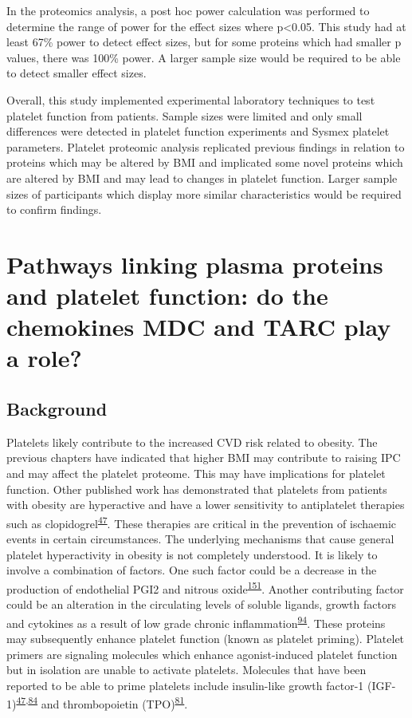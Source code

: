 \documentclass[11pt,twoside]{bristolthesis}
\begin{document}
In the proteomics analysis, a post hoc power calculation was performed to determine the range of power for the effect sizes where p\textless0.05. This study had at least 67\% power to detect effect sizes, but for some proteins which had smaller p values, there was 100\% power. A larger sample size would be required to be able to detect smaller effect sizes.

Overall, this study implemented experimental laboratory techniques to test platelet function from patients. Sample sizes were limited and only small differences were detected in platelet function experiments and Sysmex platelet parameters. Platelet proteomic analysis replicated previous findings in relation to proteins which may be altered by BMI and implicated some novel proteins which are altered by BMI and may lead to changes in platelet function. Larger sample sizes of participants which display more similar characteristics would be required to confirm findings.

\hypertarget{chemokine-platelets}{%
\chapter{Pathways linking plasma proteins and platelet function: do the chemokines MDC and TARC play a role?}\label{chemokine-platelets}}

\hypertarget{background-3}{%
\section{Background}\label{background-3}}

Platelets likely contribute to the increased CVD risk related to obesity. The previous chapters have indicated that higher BMI may contribute to raising IPC and may affect the platelet proteome. This may have implications for platelet function. Other published work has demonstrated that platelets from patients with obesity are hyperactive and have a lower sensitivity to antiplatelet therapies such as clopidogrel\textsuperscript{\protect\hyperlink{ref-Nardin2015}{47}}. These therapies are critical in the prevention of ischaemic events in certain circumstances. The underlying mechanisms that cause general platelet hyperactivity in obesity is not completely understood. It is likely to involve a combination of factors. One such factor could be a decrease in the production of endothelial PGI2 and nitrous oxide\textsuperscript{\protect\hyperlink{ref-BelindeChantemele2012a}{151}}. Another contributing factor could be an alteration in the circulating levels of soluble ligands, growth factors and cytokines as a result of low grade chronic inflammation\textsuperscript{\protect\hyperlink{ref-Esser2014}{94}}. These proteins may subsequently enhance platelet function (known as platelet priming). Platelet primers are signaling molecules which enhance agonist-induced platelet function but in isolation are unable to activate platelets. Molecules that have been reported to be able to prime platelets include insulin-like growth factor-1 (IGF-1)\textsuperscript{\protect\hyperlink{ref-Nardin2015}{47},\protect\hyperlink{ref-Blair2015}{84}} and thrombopoietin (TPO)\textsuperscript{\protect\hyperlink{ref-Maury2010a}{81}}.
\end{document}
